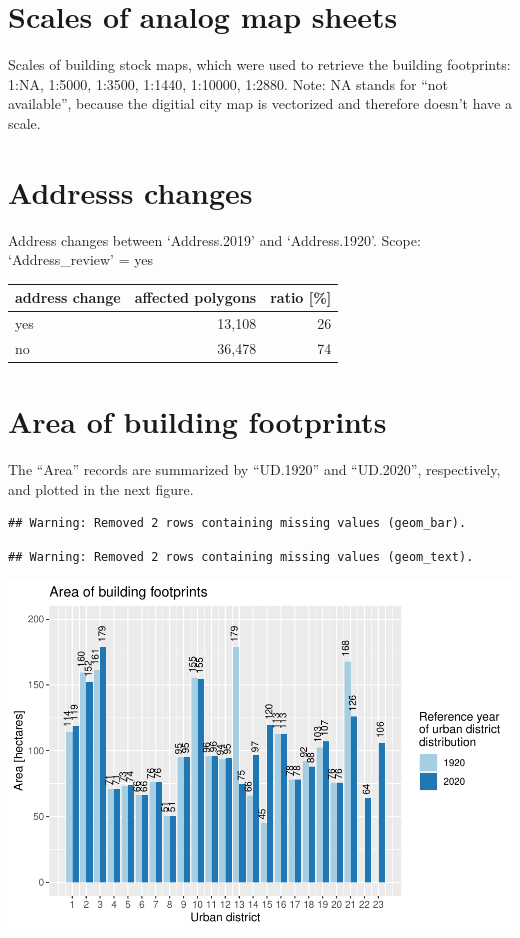 \documentclass[
]{article}
\begin{document}
\hypertarget{scales-of-analog-map-sheets}{%
\section{Scales of analog map
sheets}\label{scales-of-analog-map-sheets}}

Scales of building stock maps, which were used to retrieve the building
footprints: 1:NA, 1:5000, 1:3500, 1:1440, 1:10000, 1:2880. Note: NA
stands for ``not available'', because the digitial city map is
vectorized and therefore doesn't have a scale.

\hypertarget{addresss-changes}{%
\section{Addresss changes}\label{addresss-changes}}

Address changes between `Address.2019' and `Address.1920'. Scope:
`Address\_review' = yes

\begin{tabular}[t]{l|r|r}
\hline
address change & affected polygons & ratio [\%]\\
\hline
yes & 13,108 & 26\\
\hline
no & 36,478 & 74\\
\hline
\end{tabular}

\hypertarget{area-of-building-footprints}{%
\section{Area of building
footprints}\label{area-of-building-footprints}}

The ``Area'' records are summarized by ``UD.1920'' and ``UD.2020'',
respectively, and plotted in the next figure.

\begin{verbatim}
## Warning: Removed 2 rows containing missing values (geom_bar).
\end{verbatim}

\begin{verbatim}
## Warning: Removed 2 rows containing missing values (geom_text).
\end{verbatim}

\includegraphics{Usage_code_files/figure-latex/unnamed-chunk-4-1.pdf}
\end{document}

